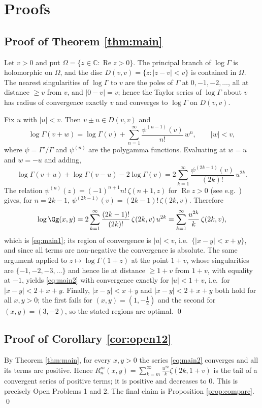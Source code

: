 
\section{Proofs}

\subsection{Proof of Theorem \ref{thm:main}}
Let $v>0$ and put $\Omega=\{z\in\mathbb{C}:\operatorname{Re}z>0\}$. The principal branch of
$\log\Gamma$ is holomorphic on $\Omega$, and the disc $D(v,v)=\{z:|z-v|<v\}$ is contained in
$\Omega$. The nearest singularities of $\log\Gamma$ to $v$ are the poles of $\Gamma$ at
$0,-1,-2,\dots$, all at distance $\ge v$ from $v$, and $|0-v|=v$; hence the Taylor series of
$\log\Gamma$ about $v$ has radius of convergence exactly $v$ and converges to $\log\Gamma$
on $D(v,v)$.

Fix $u$ with $|u|<v$. Then $v\pm u\in D(v,v)$ and
\[
  \log\Gamma(v+w)=\log\Gamma(v)+\sum_{n=1}^{\infty}\frac{\psi^{(n-1)}(v)}{n!}\,w^{n},
  \qquad |w|<v ,
\]
where $\psi=\Gamma'/\Gamma$ and $\psi^{(n)}$ are the polygamma functions. Evaluating at
$w=u$ and $w=-u$ and adding,
\[
  \log\Gamma(v+u)+\log\Gamma(v-u)-2\log\Gamma(v)
   =2\sum_{k=1}^{\infty}\frac{\psi^{(2k-1)}(v)}{(2k)!}\,u^{2k}.
\]
The relation $\psi^{(n)}(z)=(-1)^{n+1}n!\,\zeta(n+1,z)$ for $\operatorname{Re}z>0$
(see e.g.\ \cite[\S5.15]{DLMF}) gives, for $n=2k-1$,
$\psi^{(2k-1)}(v)=(2k-1)!\,\zeta(2k,v)$. Therefore
\[
  \log\Gg(x,y)=2\sum_{k=1}^{\infty}\frac{(2k-1)!}{(2k)!}\,\zeta(2k,v)\,u^{2k}
   =\sum_{k=1}^{\infty}\frac{u^{2k}}{k}\,\zeta(2k,v),
\]
which is \eqref{eq:main1}; its region of convergence is $|u|<v$, i.e.\
$\{|x-y|<x+y\}$, and since all terms are non-negative the convergence is absolute. The
same argument applied to $z\mapsto\log\Gamma(1+z)$ at the point $1+v$, whose singularities
are $\{-1,-2,-3,\dots\}$ and hence lie at distance $\ge1+v$ from $1+v$, with equality at
$-1$, yields \eqref{eq:main2} with convergence exactly for $|u|<1+v$, i.e.\ for
$|x-y|<2+x+y$. Finally, $|x-y|<x+y$ and $|x-y|<2+x+y$ both hold for all $x,y>0$; the first
fails for $(x,y)=(1,-\tfrac12)$ and the second for $(x,y)=(3,-2)$, so the stated regions are
optimal. \qed

\subsection{Proof of Corollary \ref{cor:open12}}
By Theorem \ref{thm:main}, for every $x,y>0$ the series \eqref{eq:main2} converges and all
its terms are positive. Hence
$R^{m}_{n}(x,y)=\sum_{k=m}^{\infty}\frac{u^{2k}}{k}\zeta(2k,1+v)$
is the tail of a convergent series of positive terms; it is positive and decreases to $0$.
This is precisely Open Problems 1 and 2. The final claim is Proposition
\ref{prop:compare}. \qed

